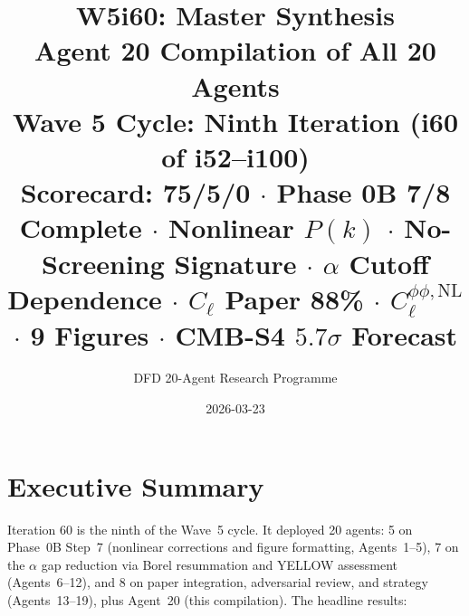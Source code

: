 \documentclass[11pt,a4paper]{article}
\title{\Huge W5i60: Master Synthesis\\[12pt]
\Large Agent 20 Compilation of All 20 Agents\\[6pt]
\large Wave 5 Cycle: Ninth Iteration (i60 of i52--i100)\\[6pt]
\normalsize Scorecard: 75/5/0 $\cdot$ Phase 0B 7/8 Complete $\cdot$ Nonlinear $P(k)$ $\cdot$ No-Screening Signature $\cdot$ $\alpha$ Cutoff Dependence $\cdot$ $C_\ell$ Paper 88\% $\cdot$ $C_\ell^{\phi\phi,\mathrm{NL}}$ $\cdot$ 9 Figures $\cdot$ CMB-S4 $5.7\sigma$ Forecast}
\author{DFD 20-Agent Research Programme}
\date{2026-03-23}
\begin{document}
\maketitle


\section{Executive Summary}

Iteration 60 is the ninth of the Wave~5 cycle. It deployed 20 agents: 5 on Phase~0B Step~7 (nonlinear corrections and figure formatting, Agents~1--5), 7 on the $\alpha$ gap reduction via Borel resummation and YELLOW assessment (Agents~6--12), and 8 on paper integration, adversarial review, and strategy (Agents~13--19), plus Agent~20 (this compilation). The headline results:
\end{document}
